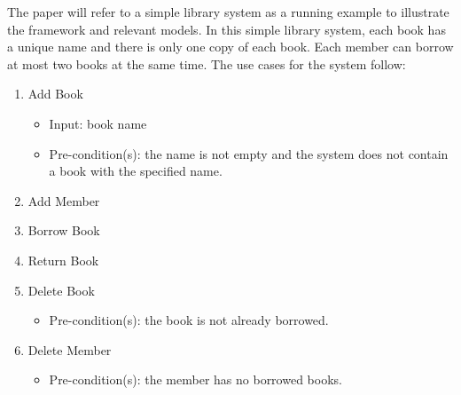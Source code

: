 %
%
\label{sec:running-example}
The paper will refer to a simple library system as a running example to illustrate the framework and relevant models. 
In this simple library system, each book has a unique name and there is only one copy of each book. Each member can borrow at most two books at the same time. The use cases for the system follow:
\begin{enumerate}
	\item Add Book 
	\begin{itemize}
		\item  Input: book name
		\item Pre-condition(s): the name is not empty and the system does not contain a book with the specified name.
	\end{itemize}

	\item Add Member
	
	\item Borrow Book
	\begin{itemize}
	\end{itemize}

	\item Return Book
	
	\item Delete Book
	\begin{itemize}
		\item Pre-condition(s): the book is not already borrowed.
	\end{itemize}

	\item Delete Member
	\begin{itemize}
		\item Pre-condition(s): the member has no borrowed books.
	\end{itemize}
\end{enumerate}
